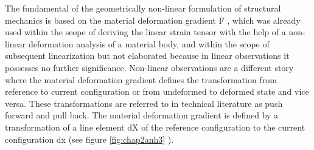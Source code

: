\noindent
The fundamental of the geometrically non-linear formulation of structural mechanics is based on
the material deformation gradient F , which was already used within the scope of deriving the linear strain tensor  with the help of a non-linear deformation analysis of a material body, and
within the scope of subsequent linearization but not elaborated
because in linear observations it possesses no further significance. Non-linear observations are
a different story where the material deformation gradient defines the transformation from
reference to current configuration or from undeformed to deformed state and vice versa. These
transformations are referred to in technical literature as push forward and pull back. The
material deformation gradient is defined by a transformation of a line element dX of the
reference configuration to the current configuration dx (see figure \ref{fig:chap2anh3} ).


